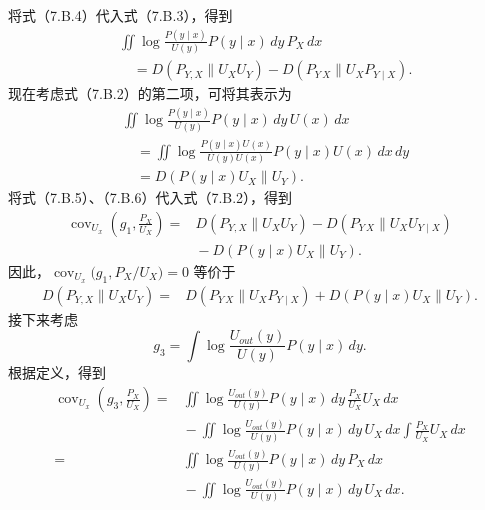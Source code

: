 将式（7.B.4）代入式（7.B.3），得到
\begin{equation}
\begin{aligned}
&\iint\log\frac{P(y\mid x)}{U(y)}P(y\mid x)\,dy\,P_X\,dx\\
&\quad=D(P_{Y,X}\parallel U_XU_Y)-D(P_{Y\,X}\parallel U_XP_{Y\mid X}).
\end{aligned}\tag{7.B.5}
\end{equation}
现在考虑式（7.B.2）的第二项，可将其表示为
\begin{equation}
\begin{aligned}
&\iint\log\frac{P(y\mid x)}{U(y)}P(y\mid x)\,dy\,U(x)\,dx\\
&\quad=\iint\log\frac{P(y\mid x)U(x)}{U(y)U(x)}P(y\mid x)U(x)\,dx\,dy\\
&\quad=D(P(y\mid x)U_X\parallel U_Y).
\end{aligned}\tag{7.B.6}
\end{equation}
将式（7.B.5）、（7.B.6）代入式（7.B.2），得到
\begin{equation}
\begin{aligned}
\operatorname{cov}_{U_x}\left(g_1,\frac{P_X}{U_X}\right)
={}&D(P_{Y,X}\parallel U_XU_Y)-D(P_{Y\,X}\parallel U_XU_{Y\mid X})\\
&{}-D(P(y\mid x)U_X\parallel U_Y).
\end{aligned}\tag{7.B.7}
\end{equation}
因此，$\operatorname{cov}_{U_x}\bigl(g_1,P_X/U_X\bigr)=0$ 等价于
\begin{equation}
\begin{aligned}
D(P_{Y,X}\parallel U_XU_Y)
={}&D(P_{Y\,X}\parallel U_XP_{Y\mid X})
 +D(P(y\mid x)U_X\parallel U_Y).
\end{aligned}\tag{7.B.8}
\end{equation}
接下来考虑
\begin{equation}
g_3=\int\log\frac{U_{out}(y)}{U(y)}P(y\mid x)\,dy.\tag{7.B.9}
\end{equation}
根据定义，得到
\begin{equation}
\begin{aligned}
\operatorname{cov}_{U_x}\left(g_3,\frac{P_X}{U_X}\right)
={}&\iint\log\frac{U_{out}(y)}{U(y)}P(y\mid x)\,dy\,
 \frac{P_X}{U_X}U_X\,dx\\
&{}-\iint\log\frac{U_{out}(y)}{U(y)}P(y\mid x)\,dy\,U_X\,dx
 \int\frac{P_X}{U_X}U_X\,dx\\
={}&\iint\log\frac{U_{out}(y)}{U(y)}P(y\mid x)\,dy\,P_X\,dx\\
&{}-\iint\log\frac{U_{out}(y)}{U(y)}P(y\mid x)\,dy\,U_X\,dx.
\end{aligned}\tag{7.B.10}
\end{equation}
